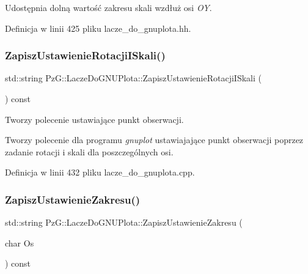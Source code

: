 Udostępnia dolną wartość zakresu skali wzdłuż osi {\itshape OY}. 

Definicja w linii 425 pliku lacze\+\_\+do\+\_\+gnuplota.\+hh.

\mbox{\label{class_pz_g_1_1_lacze_do_g_n_u_plota_aa92b463e8cbae31b50dd797a4183bce8}} 
\subsubsection{\texorpdfstring{Zapisz\+Ustawienie\+Rotacji\+I\+Skali()}{ZapiszUstawienieRotacjiISkali()}}
{\footnotesize\ttfamily std\+::string Pz\+G\+::\+Lacze\+Do\+G\+N\+U\+Plota\+::\+Zapisz\+Ustawienie\+Rotacji\+I\+Skali (\begin{DoxyParamCaption}{ }\end{DoxyParamCaption}) const\hspace{0.3cm}{\ttfamily [protected]}}



Tworzy polecenie ustawiające punkt obserwacji. 

Tworzy polecenie dla programu {\itshape gnuplot} ustawiajające punkt obserwacji poprzez zadanie rotacji i skali dla poszczególnych osi. 

Definicja w linii 432 pliku lacze\+\_\+do\+\_\+gnuplota.\+cpp.

\mbox{\label{class_pz_g_1_1_lacze_do_g_n_u_plota_a4579aecf7b4777fdde0cae4e98c275c2}} 
\subsubsection{\texorpdfstring{Zapisz\+Ustawienie\+Zakresu()}{ZapiszUstawienieZakresu()}}
{\footnotesize\ttfamily std\+::string Pz\+G\+::\+Lacze\+Do\+G\+N\+U\+Plota\+::\+Zapisz\+Ustawienie\+Zakresu (\begin{DoxyParamCaption}\item[{char}]{Os }\end{DoxyParamCaption}) const\hspace{0.3cm}{\ttfamily [protected]}}



